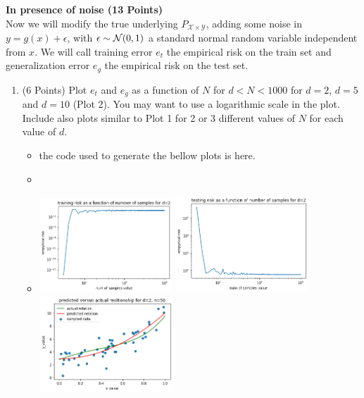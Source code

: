 \documentclass{article}
\begin{document}
\begin{enumerate}
\setcounter{saveenum}{\value{enumi}}    
\end{enumerate}    

\textbf{\color{nyupurple} In presence of noise (13 Points)}\\
Now we will modify the true underlying $P_{\mathcal{X} \times \mathcal{Y}}$, adding some noise in $y = g(x) + \epsilon$, with $\epsilon \sim {\mathcal{N}}(0,1)$ a standard normal random variable independent from $x$. We will call training error $e_t$ the empirical risk on the train set and generalization error $e_g$ the empirical risk on the test set.
\
\begin{enumerate}
\setcounter{enumi}{\value{saveenum}}

    \item (6 Points) Plot $e_t$ and $e_g$ as a function of $N$ for $d < N < 1000$ for $d = 2$, $d=5$ and $d=10$ (Plot 2). You may want to use a logarithmic scale in the plot. Include also plots similar to Plot 1 for 2 or 3 different values of $N$ for each value of $d$. 
    \begin{itemize}
    \item the code used to generate the bellow plots is here. 
            \item \inputminted[firstline=124, lastline=170, breaklines=True]{python}{hw1_code_source.py}
        \item 
             \includegraphics[width=5cm]{homework/homework_1/training_d_2.png}
            \includegraphics[width=5cm]{homework/homework_1/test_d_2.png}
             \includegraphics[width=5cm]{homework/homework_1/d_2_1.png}

\end{itemize}
\end{enumerate}
\end{document}
